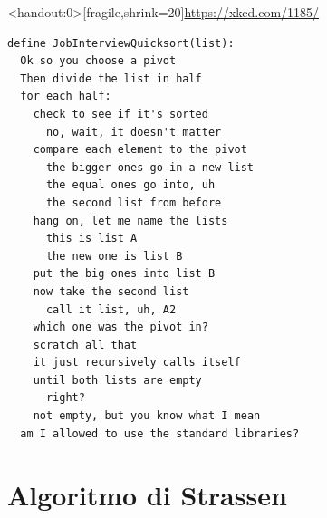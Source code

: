 \begin{frame}<handout:0>[fragile,shrink=20]{\url{https://xkcd.com/1185/}}
\vspace{-12pt}
\begin{lstlisting}
define JobInterviewQuicksort(list):
  Ok so you choose a pivot
  Then divide the list in half
  for each half:
    check to see if it's sorted
      no, wait, it doesn't matter
    compare each element to the pivot
      the bigger ones go in a new list
      the equal ones go into, uh
      the second list from before
    hang on, let me name the lists
      this is list A
      the new one is list B
    put the big ones into list B
    now take the second list
      call it list, uh, A2
    which one was the pivot in?
    scratch all that
    it just recursively calls itself
    until both lists are empty
      right?
    not empty, but you know what I mean
  am I allowed to use the standard libraries?
\end{lstlisting}

\end{frame}



\section{Algoritmo di Strassen}

